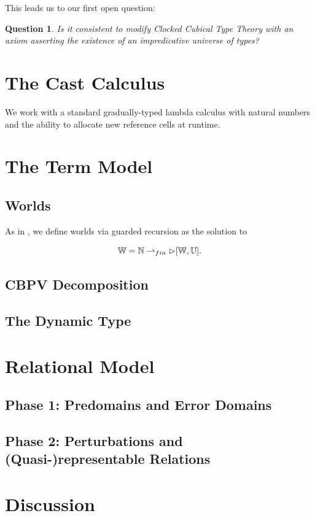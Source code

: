 \documentclass{article}
\newcommand{\W}{\mathbb{W}}
\newcommand{\U}{\mathbb{U}}
\newcommand{\finmap}[1]{\mathbb{N} \rightharpoonup_{fin} {#1}}
\newtheorem{question}{Question}
\theoremstyle{definition}
\theoremstyle{remark}
\begin{document}
This leads us to our first open question:

\begin{question}
Is it consistent to modify Clocked Cubical Type Theory
\cite{kristensen-mogelberg-vezzosi2022} with an axiom asserting the existence of an
impredicative universe of types?
\end{question}

\section{The Cast Calculus}

We work with a standard gradually-typed lambda calculus with natural numbers
and the ability to allocate new reference cells at runtime.

\section{The Term Model}

\subsection{Worlds}

As in \cite{DBLP:journals/corr/abs-2210-02169}, we define worlds via guarded
recursion as the solution to

\[ \W = \finmap{\later [\W, \U]}.  \] 

\subsection{CBPV Decomposition}


\subsection{The Dynamic Type}


\section{Relational Model}

\subsection{Phase 1: Predomains and Error Domains}

\subsection{Phase 2: Perturbations and (Quasi-)representable Relations}


\section{Discussion}




% 

\end{document}
